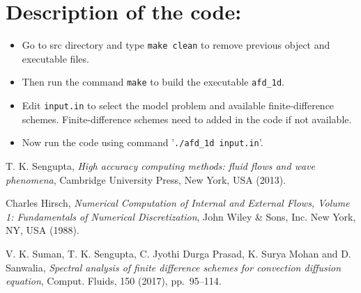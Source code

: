 \documentclass[fleqn]{article}
\begin{document}
\section{Description of the code:}
\begin{itemize}
\item Go to src directory and type {\tt make clean} to remove previous object and executable files.
\item Then run the command {\tt make} to build the executable {\tt afd\_1d}.
\item Edit {\tt input.in} to select the model problem and available finite-difference schemes. Finite-difference schemes need to added in the code if not available.
\item Now run the code using command '{\tt ./afd\_1d input.in}'.
\end{itemize}


\begin{thebibliography}{1}

        {\sc T. K. Sengupta}, {\em High accuracy computing methods: fluid flows and wave phenomena}, Cambridge University Press, New York, USA (2013).

        {\sc Charles Hirsch}, {\em Numerical Computation of Internal and External Flows, Volume 1: Fundamentals of Numerical Discretization}, John Wiley \& Sons, Inc. New York, NY, USA (1988).

        {\sc V. K. Suman, T. K. Sengupta, C. Jyothi Durga Prasad, K. Surya Mohan and D. Sanwalia}, {\em Spectral analysis of finite difference schemes for convection diffusion equation}, Comput. Fluids, 150 (2017), pp.~95--114.     
        
\end{thebibliography}
\end{document}

